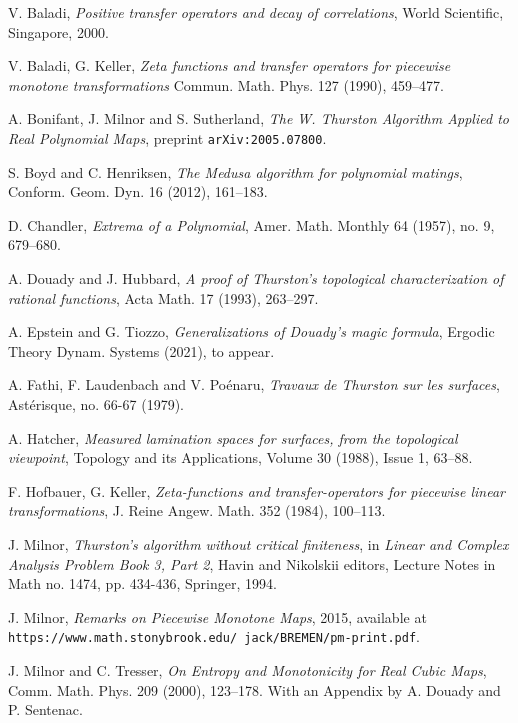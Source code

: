 \documentclass[11pt]{amsart}
\begin{document}
\begin{thebibliography}{99}

V. Baladi, \emph{Positive transfer operators and decay of correlations}, 
World Scientific, Singapore, 2000.

V. Baladi, G. Keller, 
\emph{Zeta functions and transfer operators for piecewise monotone transformations}
Commun. Math. Phys. 127 (1990), 459--477.


A. Bonifant, J. Milnor and S. Sutherland, 
\emph{The W. Thurston Algorithm Applied to Real Polynomial Maps}, 
preprint \texttt{arXiv:2005.07800}.

S. Boyd and C. Henriksen, \emph{The Medusa algorithm for polynomial matings}, 
Conform. Geom. Dyn. 16 (2012), 161--183.

D. Chandler, \emph{Extrema of a Polynomial}, 
Amer. Math. Monthly 64 (1957), no. 9, 679--680.

A. Douady and J. Hubbard, \emph{A proof of Thurston's topological characterization of rational functions}, 
Acta Math. 17 (1993), 263--297.

A. Epstein and G. Tiozzo, \emph{Generalizations of Douady's magic formula}, 
Ergodic Theory Dynam. Systems (2021), to appear. 

A. Fathi, F. Laudenbach and V. Po\'enaru, \emph{Travaux de Thurston sur les surfaces},
Ast\'erisque, no. 66-67 (1979).

A. Hatcher, \emph{Measured lamination spaces for surfaces, from the topological viewpoint},
Topology and its Applications, Volume 30 (1988), Issue 1, 63--88.

F. Hofbauer, G. Keller, 
\emph{Zeta-functions and transfer-operators for piecewise linear transformations}, 
J. Reine Angew. Math. 352 (1984), 100--113.


J. Milnor, \emph{Thurston's algorithm without critical finiteness}, in \emph{Linear and
Complex Analysis Problem Book 3, Part 2}, Havin and Nikolskii editors, Lecture
Notes in Math no. 1474, pp. 434-436, Springer, 1994.

J. Milnor, \emph{Remarks on Piecewise Monotone Maps}, 2015, 
available at \texttt{https://www.math.stonybrook.edu/~jack/BREMEN/pm-print.pdf}.

J. Milnor and C. Tresser,
\emph{On Entropy and Monotonicity for Real Cubic Maps}, 
Comm. Math. Phys. 209 (2000), 123--178. With an Appendix by A. Douady and P. Sentenac.


\end{thebibliography}
\end{document}
